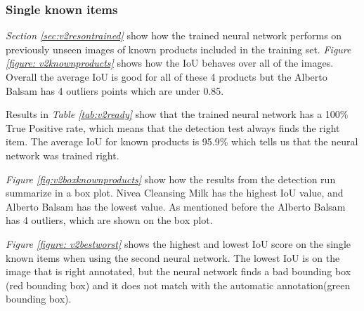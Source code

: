 \subsubsection{Single known items}
\textit{Section \ref{sec:v2resontrained}} show how the trained neural network performs on previously unseen images of known products included in the training set. \textit{Figure \ref{figure: v2knownproducts}} shows how the IoU behaves over all of the images. Overall the average IoU is good for all of these 4 products but the Alberto Balsam has 4 outliers points which are under 0.85.%

Results in \textit{Table \ref{tab:v2ready}} show that the trained neural network has a 100\% True Positive rate, which means that the detection test always finds the right item. The average IoU for known products is 95.9\% which tells us that the neural network was trained right.

\textit{Figure \ref{fig:v2boxknownproducts}} show how the results from the detection run summarize in a box plot. Nivea Cleansing Milk has the highest IoU value, and Alberto Balsam has the lowest value. As mentioned before the Alberto Balsam has 4 outliers, which are shown on the box plot.

\textit{Figure \ref{figure: v2bestworst}} shows the highest and lowest IoU score on the single known items when using the second neural network. The lowest IoU is on the image that is right annotated, but the neural network finds a bad bounding box (red bounding box) and it does not match with the automatic annotation(green bounding box).



